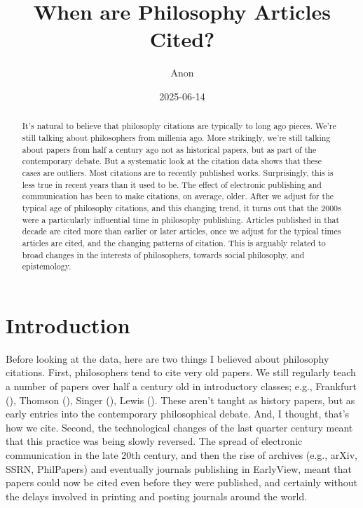 \documentclass[
  12pt,
  letterpaper,
  DIV=11,
  numbers=noendperiod]{scrartcl}
\title{When are Philosophy Articles Cited?}
\author{Anon}
\date{2025-06-14}
\begin{document}
\maketitle
\begin{abstract}
It's natural to believe that philosophy citations are typically to long
ago pieces. We're still talking about philosophers from millenia ago.
More strikingly, we're still talking about papers from half a century
ago not as historical papers, but as part of the contemporary debate.
But a systematic look at the citation data shows that these cases are
outliers. Most citations are to recently published works. Surprisingly,
this is less true in recent years than it used to be. The effect of
electronic publishing and communication has been to make citations, on
average, older. After we adjust for the typical age of philosophy
citations, and this changing trend, it turns out that the 2000s were a
particularly influential time in philosophy publishing. Articles
published in that decade are cited more than earlier or later articles,
once we adjust for the typical times articles are cited, and the
changing patterns of citation. This is arguably related to broad changes
in the interests of philosophers, towards social philosophy, and
epistemology.
\end{abstract}


\section{Introduction}\label{sec-introduction}

Before looking at the data, here are two things I believed about
philosophy citations. First, philosophers tend to cite very old papers.
We still regularly teach a number of papers over half a century old in
introductory classes; e.g., Frankfurt
(), Thomson
(), Singer
(), Lewis
(). These aren't taught as history
papers, but as early entries into the contemporary philosophical debate.
And, I thought, that's how we cite. Second, the technological changes of
the last quarter century meant that this practice was being slowly
reversed. The spread of electronic communication in the late 20th
century, and then the rise of archives (e.g., arXiv, SSRN, PhilPapers)
and eventually journals publishing in EarlyView, meant that papers could
now be cited even before they were published, and certainly without the
delays involved in printing and posting journals around the world.
\end{document}
